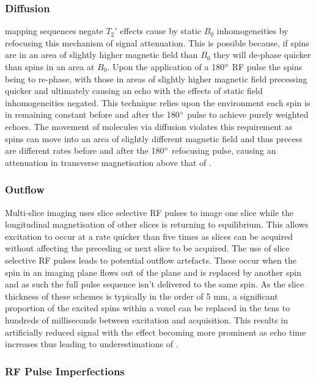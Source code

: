 \subsubsection{Diffusion}
\ttwo mapping sequences negate $T_2'$ effects cause by static $B_0$ inhomogeneities by refocusing this mechanism of signal attenuation. This is possible because, if spins are in an area of slightly higher magnetic field than $B_0$ they will de-phase quicker than spins in an area at $B_0$. Upon the application of a 180$\degree$ \ac{RF} pulse the spins being to re-phase, with those in areas of slightly higher magnetic field precessing quicker and ultimately causing an echo with the effects of static field inhomogeneities negated. This technique relies upon the environment each spin is in remaining constant before and after the 180$\degree$ pulse to achieve purely \ttwo weighted echoes. The movement of molecules via diffusion violates this requirement as spins can move into an area of slightly different magnetic field and thus precess are different rates before and after the 180$\degree$ refocusing pulse, causing an attenuation in transverse magnetisation above that of \ttwo \cite{carr_effects_1954}.

\subsubsection{Outflow}

Multi-slice imaging uses slice selective \ac{RF} pulses to image one slice while the longitudinal magnetisation of other slices is returning to equilibrium. This allows excitation to occur at a rate quicker than five times \tone as slices can be acquired without affecting the preceding or next slice to be acquired. The use of slice selective \ac{RF} pulses leads to potential outflow artefacts. These occur when the spin in an imaging plane flows out of the plane and is replaced by another spin and as such the full pulse sequence isn't delivered to the same spin. As the slice thickness of these schemes is typically in the order of 5 mm, a significant proportion of the excited spins within a voxel can be replaced in the tens to hundreds of milliseconds between excitation and acquisition. This results in artificially reduced signal with the effect becoming more prominent as echo time increases thus leading to underestimations of \ttwo.

\subsubsection{RF Pulse Imperfections}

